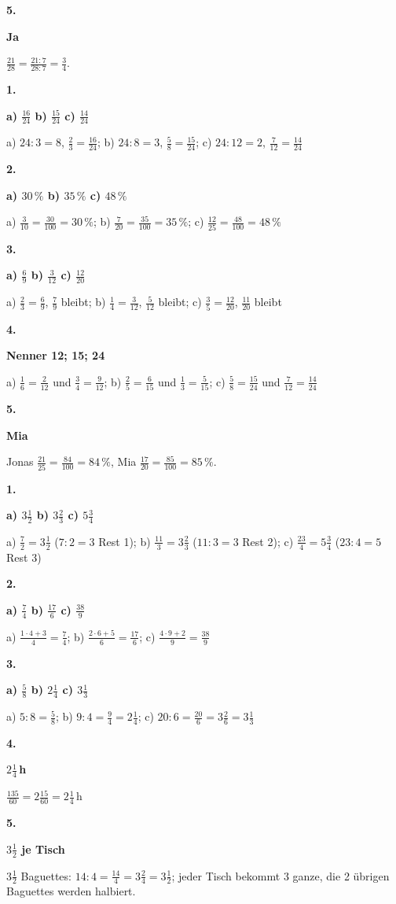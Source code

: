 \documentclass[11pt]{article}
\newcommand{\lsg}[3]{\par\noindent\begin{minipage}[t]{9mm}\textbf{#1}\end{minipage}%
  \begin{minipage}[t]{52mm}\raggedright\bfseries\boldmath #2\end{minipage}\hspace{3mm}%
  \begin{minipage}[t]{\dimexpr\linewidth-64mm\relax}\raggedright\small #3\end{minipage}\par\vspace{4pt}}
\begin{document}
\lsg{5.}{Ja}{$\frac{21}{28} = \frac{21 : 7}{28 : 7} = \frac{3}{4}$.}
\par\Needspace{25mm}\vspace{6pt}\noindent\colorbox{black!12}{}\hspace{2mm}{\bfseries Auf einen gemeinsamen Nenner bringen}\par\vspace{4pt}
\lsg{1.}{a) $\frac{16}{24}$ \quad b) $\frac{15}{24}$ \quad c) $\frac{14}{24}$}{a) $24 : 3 = 8$, $\frac{2}{3} = \frac{16}{24}$; b) $24 : 8 = 3$, $\frac{5}{8} = \frac{15}{24}$; c) $24 : 12 = 2$, $\frac{7}{12} = \frac{14}{24}$}
\lsg{2.}{a) $30\,\%$ \quad b) $35\,\%$ \quad c) $48\,\%$}{a) $\frac{3}{10} = \frac{30}{100} = 30\,\%$; b) $\frac{7}{20} = \frac{35}{100} = 35\,\%$; c) $\frac{12}{25} = \frac{48}{100} = 48\,\%$}
\lsg{3.}{a) $\frac{6}{9}$ \quad b) $\frac{3}{12}$ \quad c) $\frac{12}{20}$}{a) $\frac{2}{3} = \frac{6}{9}$, $\frac{7}{9}$ bleibt; b) $\frac{1}{4} = \frac{3}{12}$, $\frac{5}{12}$ bleibt; c) $\frac{3}{5} = \frac{12}{20}$, $\frac{11}{20}$ bleibt}
\lsg{4.}{Nenner 12; 15; 24}{a) $\frac{1}{6} = \frac{2}{12}$ und $\frac{3}{4} = \frac{9}{12}$; b) $\frac{2}{5} = \frac{6}{15}$ und $\frac{1}{3} = \frac{5}{15}$; c) $\frac{5}{8} = \frac{15}{24}$ und $\frac{7}{12} = \frac{14}{24}$}
\lsg{5.}{Mia}{Jonas $\frac{21}{25} = \frac{84}{100} = 84\,\%$, Mia $\frac{17}{20} = \frac{85}{100} = 85\,\%$.}
\par\Needspace{25mm}\vspace{6pt}\noindent\colorbox{black!12}{}\hspace{2mm}{\bfseries Brüche größer als 1: gemischte Zahlen}\par\vspace{4pt}
\lsg{1.}{a) $3\frac{1}{2}$ \quad b) $3\frac{2}{3}$ \quad c) $5\frac{3}{4}$}{a) $\frac{7}{2} = 3\frac{1}{2}$ ($7 : 2 = 3$ Rest 1); b) $\frac{11}{3} = 3\frac{2}{3}$ ($11 : 3 = 3$ Rest 2); c) $\frac{23}{4} = 5\frac{3}{4}$ ($23 : 4 = 5$ Rest 3)}
\lsg{2.}{a) $\frac{7}{4}$ \quad b) $\frac{17}{6}$ \quad c) $\frac{38}{9}$}{a) $\frac{1 \cdot 4 + 3}{4} = \frac{7}{4}$; b) $\frac{2 \cdot 6 + 5}{6} = \frac{17}{6}$; c) $\frac{4 \cdot 9 + 2}{9} = \frac{38}{9}$}
\lsg{3.}{a) $\frac{5}{8}$ \quad b) $2\frac{1}{4}$ \quad c) $3\frac{1}{3}$}{a) $5 : 8 = \frac{5}{8}$; b) $9 : 4 = \frac{9}{4} = 2\frac{1}{4}$; c) $20 : 6 = \frac{20}{6} = 3\frac{2}{6} = 3\frac{1}{3}$}
\lsg{4.}{$2\frac{1}{4}$\,h}{$\frac{135}{60} = 2\frac{15}{60} = 2\frac{1}{4}$\,h}
\lsg{5.}{$3\frac{1}{2}$ je Tisch}{$3\frac{1}{2}$ Baguettes: $14 : 4 = \frac{14}{4} = 3\frac{2}{4} = 3\frac{1}{2}$; jeder Tisch bekommt 3 ganze, die 2 übrigen Baguettes werden halbiert.}
\end{document}
